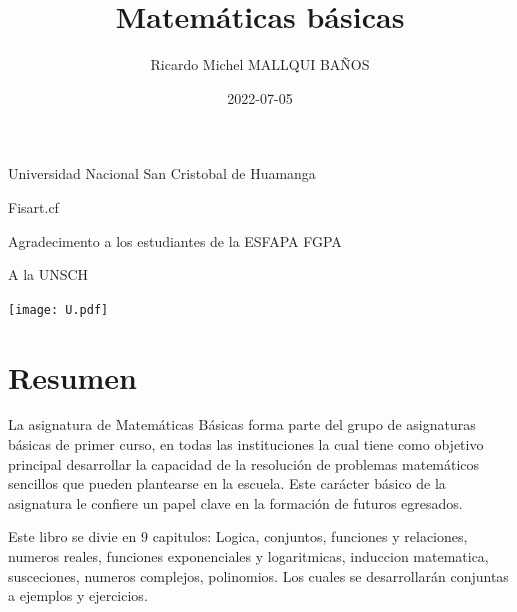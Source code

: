 \documentclass[
  16pt,
]{krantz}
\title{Matemáticas básicas}
\author{Ricardo Michel MALLQUI BAÑOS}
\date{2022-07-05}
\theoremstyle{definition}
\theoremstyle{definition}
\theoremstyle{definition}
\theoremstyle{definition}
\theoremstyle{remark}
\begin{document}
\maketitle

\thispagestyle{empty}
\begin{flushright}
Universidad Nacional San Cristobal de Huamanga

Fisart.cf

Agradecimento a los estudiantes de la ESFAPA FGPA

A la UNSCH

\texttt{[image: U.pdf]}
\end{flushright}

{
\hypersetup{linkcolor=}
\setcounter{tocdepth}{2}
\tableofcontents
}
\listoftables
\listoffigures
\newcommand{\N}{\mathbb{N}}
\newcommand{\R}{\mathbb{R}}
\newcommand{\CC}{\mathbb{C}}
\newcommand{\I}{\mathbb{I}}
\newcommand{\f}{\mathbb{f}}
\newcommand{\X}{\mathbb{X}}
\newcommand{\D}{\mathbb{D}}
\newcommand{\Z}{\mathbb{Z}}
\newcommand{\Q}{\mathbb{Q}}
\newcommand{\norm}[1]{\left\Vert#1\right\Vert}
\newcommand{\abs}[1]{\left\vert#1\right\vert}
\newcommand{\set}[1]{\left\{#1\right\}}
\newcommand{\seq}[1]{\left<#1\right>}
\newcommand{\co}[1]{\left[#1\right]}
\newcommand{\cc}[1]{\left(#1\right)}
\newcommand{\J}{\mathcal{J}}
\newcommand{\K}{\mathcal{K}}
\newcommand{\M}{\mathcal{M}}
\newcommand{\F}{\mathcal{F}}

\hypertarget{resumen}{%
\chapter*{Resumen}\label{resumen}}


La asignatura de Matemáticas Básicas forma parte del grupo de asignaturas básicas de primer curso, en todas las instituciones la cual tiene como objetivo principal desarrollar la capacidad de la resolución de problemas matemáticos sencillos que pueden plantearse en la escuela. Este carácter básico de la asignatura le confiere un papel clave en la formación de futuros egresados.

Este libro se divie en 9 capitulos: Logica, conjuntos, funciones y relaciones, numeros reales, funciones exponenciales y logaritmicas, induccion matematica, susceciones, numeros complejos, polinomios. Los cuales se desarrollarán conjuntas a ejemplos y ejercicios.
\end{document}
